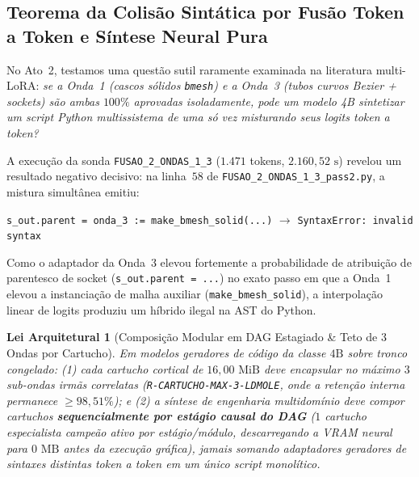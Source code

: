 \documentclass[10pt,a4paper]{article}
\newtheorem{theorem}{Lei Arquitetural}
\begin{document}
\subsection{Teorema da Colis\~ao Sint\'atica por Fus\~ao Token a Token e S\'intese Neural Pura}

No Ato~2, testamos uma quest\~ao sutil raramente examinada na literatura multi-LoRA: \textit{se a Onda~1 (cascos s\'olidos \texttt{bmesh}) e a Onda~3 (tubos curvos Bezier + sockets) s\~ao ambas $100\%$ aprovadas isoladamente, pode um modelo 4B sintetizar um script Python multissistema de uma s\'o vez misturando seus logits token a token?}

A execu\c{c}\~ao da sonda \texttt{FUSAO\_\allowbreak{}2\_\allowbreak{}ONDAS\_\allowbreak{}1\_\allowbreak{}3} ($1.471$ tokens, $2.160,52\text{ s}$) revelou um resultado negativo decisivo: na linha~$58$ de \texttt{FUSAO\_\allowbreak{}2\_\allowbreak{}ONDAS\_\allowbreak{}1\_\allowbreak{}3\_\allowbreak{}pass2.py}, a mistura simult\^anea emitiu:
\begin{center}
  \texttt{s\_\allowbreak{}out.parent = onda\_\allowbreak{}3 := make\_\allowbreak{}bmesh\_\allowbreak{}solid(...)} \quad $\longrightarrow$ \quad \texttt{SyntaxError: invalid syntax}
\end{center}
Como o adaptador da Onda~3 elevou fortemente a probabilidade de atribui\c{c}\~ao de parentesco de socket (\texttt{s\_\allowbreak{}out.parent = ...}) no exato passo em que a Onda~1 elevou a instancia\c{c}\~ao de malha auxiliar (\texttt{make\_\allowbreak{}bmesh\_\allowbreak{}solid}), a interpola\c{c}\~ao linear de logits produziu um h\'ibrido ilegal na AST do Python.

\begin{theorem}[Composi\c{c}\~ao Modular em DAG Estagiado \& Teto de 3 Ondas por Cartucho]
Em modelos geradores de c\'odigo da classe $4\text{B}$ sobre tronco congelado: (1) cada cartucho cortical de $16,00\text{ MiB}$ deve encapsular no m\'aximo $3$ sub-ondas irm\~as correlatas (\texttt{R-CARTUCHO-MAX-3-LDMOLE}, onde a reten\c{c}\~ao interna permanece $\ge 98,51\%$); e (2) a s\'intese de engenharia multidom\'inio deve compor cartuchos \textbf{sequencialmente por est\'agio causal do DAG} ($1$ cartucho especialista campe\~ao ativo por est\'agio/m\'odulo, descarregando a VRAM neural para $0\text{ MB}$ antes da execu\c{c}\~ao gr\'afica), jamais somando adaptadores geradores de sintaxes distintas token a token em um \'unico script monol\'itico.
\end{theorem}
\end{document}
